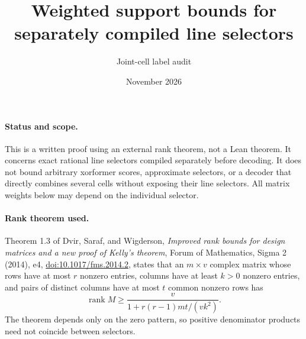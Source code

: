 \documentclass[11pt]{article}
\title{Weighted support bounds for separately compiled line selectors}
\author{Joint-cell label audit}
\date{November 2026}
\newcommand{\rank}{\operatorname{rank}}
\begin{document}
\maketitle

\paragraph{Status and scope.}
This is a written proof using an external rank theorem, not a Lean theorem.
It concerns exact rational line selectors compiled separately before decoding.
It does not bound arbitrary xorformer scores, approximate selectors, or a decoder
that directly combines several cells without exposing their line selectors.
All matrix weights below may depend on the individual selector.

\paragraph{Rank theorem used.}
Theorem 1.3 of Dvir, Saraf, and Wigderson,
\emph{Improved rank bounds for design matrices and a new proof of Kelly's theorem},
Forum of Mathematics, Sigma 2 (2014), e4,
\href{https://doi.org/10.1017/fms.2014.2}{doi:10.1017/fms.2014.2}, states that an
$m\times v$ complex matrix whose rows have at most $r$ nonzero entries,
columns have at least $k>0$ nonzero entries, and pairs of distinct columns
have at most $t$ common nonzero rows has
\begin{equation}\label{eq:dsw}
 \rank M\geq \frac{v}{1+r(r-1)mt/(vk^2)}.
\end{equation}
The theorem depends only on the zero pattern, so positive denominator products
need not coincide between selectors.
\end{document}
